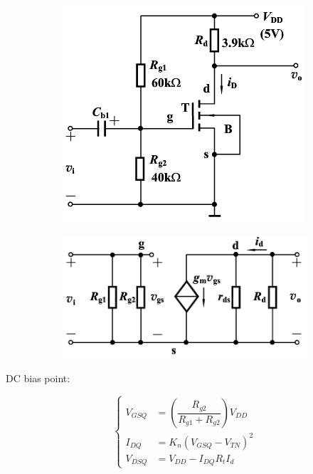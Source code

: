 \begin{figure}[H]
  \centering
  \begin{subfigure}{.5\textwidth}
    \centering
    \includegraphics[width=\linewidth]{figures/MOSFET-Common-S}
  \end{subfigure}
  \begin{subfigure}{.45\textwidth}
    \centering
    \includegraphics[width=\linewidth]{figures/MOSFET-Common-Ss}
  \end{subfigure}
\end{figure}

DC bias point:

\begin{equation*}
  \left\{
  \begin{aligned}
    V_{GSQ} &= \left( \dfrac{R_{g2}}{R_{g1} + R_{g2}}  \right) V_{DD} \\
    I_{DQ} &= K_n \left( V_{GSQ} - V_{TN} \right)^2 \\
    V_{DSQ} &= V_{DD} - I_{DQ} R_tI_d
  \end{aligned}
  \right.
\end{equation*}

